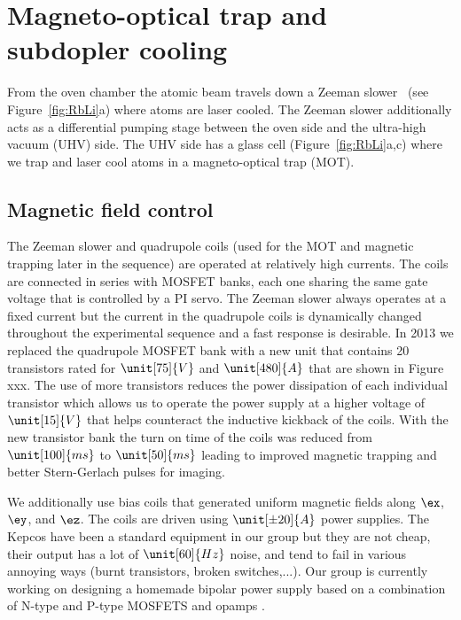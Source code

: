 \section{Magneto-optical trap and subdopler cooling}

From the oven chamber the atomic beam travels down a Zeeman slower~\cite{phillips_laser_1982 } (see Figure~\ref{fig:RbLi}a) where atoms are laser cooled. The Zeeman slower additionally acts as a differential pumping stage between the oven side and the ultra-high vacuum (UHV) side. The UHV side has a glass cell (Figure~\ref{fig:RbLi}a,c) where we trap and laser cool atoms in a magneto-optical trap (MOT).

\subsection{Magnetic field control}
The Zeeman slower and quadrupole coils (used for the MOT and magnetic trapping later in the sequence) are operated at relatively high currents. The coils are connected in series with MOSFET banks, each one sharing the same gate voltage that is controlled by a PI servo. The Zeeman slower always operates at a fixed current but the current in the quadrupole coils is dynamically changed throughout the experimental sequence and a fast response is desirable. In 2013 we replaced the quadrupole MOSFET bank with a new unit that contains 20  transistors rated for $\unit[75]{V}$ and $\unit[480]{A}$ that are shown in Figure xxx. The use of more transistors reduces the power dissipation of each individual transistor which allows us to operate the power supply at a higher voltage of $\unit[15]{V}$ that helps counteract the inductive kickback of the coils. With the new transistor bank the turn on time of the coils was reduced from $\unit[100]{ms}$ to $\unit[50]{ms}$ leading to improved magnetic trapping and better Stern-Gerlach pulses for imaging.

We additionally use bias coils that generated uniform magnetic fields along $\ex$, $\ey$, and $\ez$. The coils are driven using  $\unit[\pm20]{A}$ power supplies. The Kepcos have been a standard equipment in our group but they are not cheap, their output has a lot of $\unit[60]{Hz}$ noise, and tend to fail in various annoying ways (burnt transistors, broken switches,...). Our group is currently working on designing a homemade bipolar power supply based on a combination of N-type and P-type MOSFETS and opamps .  


